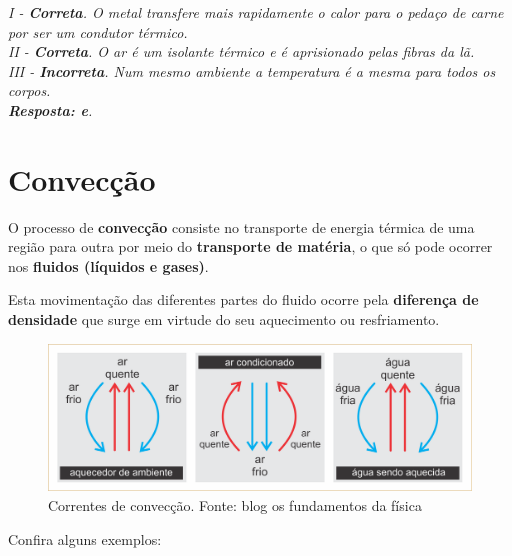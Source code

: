 \documentclass[12pt,twoside]{article}
\newenvironment{resposta*}
{\bf Resposta:\\ }
{}
\begin{document}
\begin{resposta*}
{\it I - \textbf{Correta}. O metal transfere mais rapidamente o calor para o pedaço de carne por ser um condutor térmico. \\
II - \textbf{Correta}. O ar é um isolante térmico e é aprisionado pelas fibras da lã. \\
III - \textbf{Incorreta}. Num mesmo ambiente a temperatura é a mesma para todos os corpos. \\
\textbf{Resposta: e}.}
\end{resposta*}

\hypertarget{x-convecção}{\section{Convecção}}
O processo de \textbf{convecção} consiste no transporte de energia térmica de uma região para outra por meio do \textbf{transporte de matéria}, o que só pode ocorrer nos \textbf{fluidos (líquidos e gases)}.


Esta movimentação das diferentes partes do fluido ocorre pela \textbf{diferença de densidade} que surge em virtude do seu aquecimento ou resfriamento.


\begin{figure}[ht]{}
\centering\includegraphics[width=2.5truein]{conveccao.png}
\caption{Correntes de convecção. Fonte: blog os fundamentos da física}

\end{figure}

Confira alguns exemplos:
\end{document}
